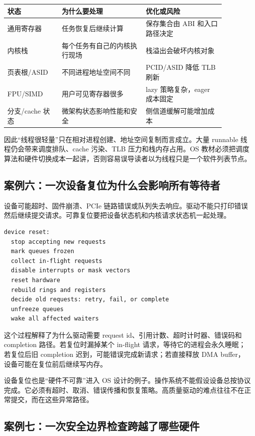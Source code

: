 \begin{longtable}{p{0.22\linewidth}p{0.34\linewidth}p{0.32\linewidth}}
\toprule
状态 & 为什么要处理 & 优化或风险 \\
\midrule
通用寄存器 & 任务恢复后继续计算 & 保存集合由 ABI 和入口路径决定 \\
内核栈 & 每个任务有自己的内核执行现场 & 栈溢出会破坏内核对象 \\
页表根/ASID & 不同进程地址空间不同 & PCID/ASID 降低 TLB 刷新 \\
FPU/SIMD & 用户可见寄存器很多 & lazy 策略复杂，eager 成本固定 \\
分支/cache 状态 & 微架构状态影响性能和安全 & 侧信道缓解可能增加成本 \\
\bottomrule
\end{longtable}

因此“线程很轻量”只在相对进程创建、地址空间复制而言成立。大量 runnable 线程仍会带来调度排队、cache 污染、TLB 压力和栈内存占用。OS 教材必须把调度算法和硬件切换成本一起讲，否则容易误导读者以为线程只是一个软件列表节点。

\subsection{案例六：一次设备复位为什么会影响所有等待者}

设备可能超时、固件崩溃、PCIe 链路错误或队列失去响应。驱动不能只打印错误然后继续提交请求。可靠复位要把设备状态机和内核请求状态机一起处理。

\begin{lstlisting}
device reset:
  stop accepting new requests
  mark queues frozen
  collect in-flight requests
  disable interrupts or mask vectors
  reset hardware
  rebuild rings and registers
  decide old requests: retry, fail, or complete
  unfreeze queues
  wake all affected waiters
\end{lstlisting}

这个过程解释了为什么驱动需要 request id、引用计数、超时计时器、错误码和 completion 路径。若复位时漏掉某个 in-flight 请求，等待它的进程会永久睡眠；若复位后旧 completion 迟到，可能错误完成新请求；若直接释放 DMA buffer，设备可能在复位前后继续写内存。

设备复位也是“硬件不可靠”进入 OS 设计的例子。操作系统不能假设设备总按协议完成。它必须有超时、取消、错误传播和恢复策略。高质量驱动的难点往往不在正常提交，而在这些异常路径。

\subsection{案例七：一次安全边界检查跨越了哪些硬件}


